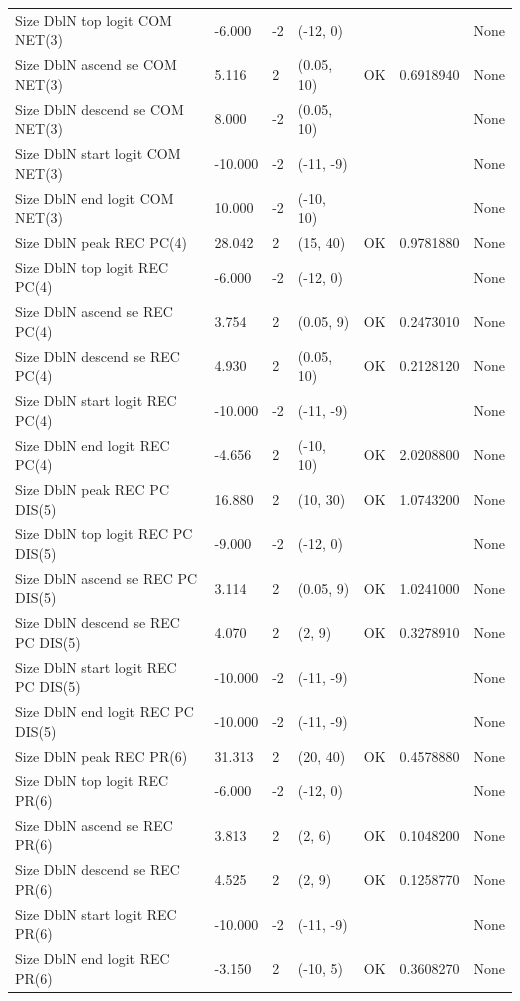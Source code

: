\documentclass[
  english,
  a4paper,
]{article}
\begin{document}
\begin{landscape}
\begin{longtable}[t]{>{\raggedright\arraybackslash}p{8.5cm}lllll>{\raggedright\arraybackslash}p{4cm}}
Size DblN top logit COM NET(3) & -6.000 & -2 & (-12, 0) &  &  & None\\
Size DblN ascend se COM NET(3) & 5.116 & 2 & (0.05, 10) & OK & 0.6918940 & None\\
Size DblN descend se COM NET(3) & 8.000 & -2 & (0.05, 10) &  &  & None\\
Size DblN start logit COM NET(3) & -10.000 & -2 & (-11, -9) &  &  & None\\
Size DblN end logit COM NET(3) & 10.000 & -2 & (-10, 10) &  &  & None\\
Size DblN peak REC PC(4) & 28.042 & 2 & (15, 40) & OK & 0.9781880 & None\\
Size DblN top logit REC PC(4) & -6.000 & -2 & (-12, 0) &  &  & None\\
Size DblN ascend se REC PC(4) & 3.754 & 2 & (0.05, 9) & OK & 0.2473010 & None\\
Size DblN descend se REC PC(4) & 4.930 & 2 & (0.05, 10) & OK & 0.2128120 & None\\
Size DblN start logit REC PC(4) & -10.000 & -2 & (-11, -9) &  &  & None\\
Size DblN end logit REC PC(4) & -4.656 & 2 & (-10, 10) & OK & 2.0208800 & None\\
Size DblN peak REC PC DIS(5) & 16.880 & 2 & (10, 30) & OK & 1.0743200 & None\\
Size DblN top logit REC PC DIS(5) & -9.000 & -2 & (-12, 0) &  &  & None\\
Size DblN ascend se REC PC DIS(5) & 3.114 & 2 & (0.05, 9) & OK & 1.0241000 & None\\
Size DblN descend se REC PC DIS(5) & 4.070 & 2 & (2, 9) & OK & 0.3278910 & None\\
Size DblN start logit REC PC DIS(5) & -10.000 & -2 & (-11, -9) &  &  & None\\
Size DblN end logit REC PC DIS(5) & -10.000 & -2 & (-11, -9) &  &  & None\\
Size DblN peak REC PR(6) & 31.313 & 2 & (20, 40) & OK & 0.4578880 & None\\
Size DblN top logit REC PR(6) & -6.000 & -2 & (-12, 0) &  &  & None\\
Size DblN ascend se REC PR(6) & 3.813 & 2 & (2, 6) & OK & 0.1048200 & None\\
Size DblN descend se REC PR(6) & 4.525 & 2 & (2, 9) & OK & 0.1258770 & None\\
Size DblN start logit REC PR(6) & -10.000 & -2 & (-11, -9) &  &  & None\\
Size DblN end logit REC PR(6) & -3.150 & 2 & (-10, 5) & OK & 0.3608270 & None\\

\end{longtable}
\end{landscape}
\end{document}
